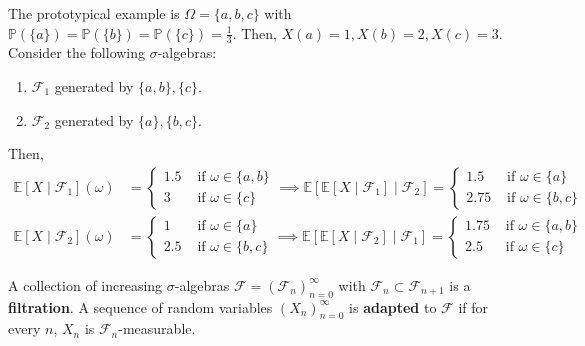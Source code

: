 	\begin{example}
		The prototypical example is $\Omega = \{a, b, c\}$ with $\mathbb{P}(\{a\}) = \mathbb{P}(\{b\}) = \mathbb{P}(\{c\}) = \frac{1}{3}$. Then, $X(a) = 1, X(b) = 2, X(c) = 3$. Consider the following $\sigma$-algebras: 
		\begin{enumerate}
			\item $\mathscr{F}_1$ generated by $\{a, b\}, \{c\}$. 
			\item $\mathscr{F}_2$ generated by $\{a\}, \{b, c\}$. 
		\end{enumerate}
		Then, 
		\begin{align}
			\mathbb{E}[X \mid \mathscr{F}_1](\omega) & = \begin{cases} 
				1.5 & \text{ if } \omega \in \{a, b\} \\ 
				3 & \text{ if } \omega \in \{c\} 
			\end{cases} \implies \mathbb{E}[ \mathbb{E}[X \mid \mathscr{F}_1] \mid \mathscr{F}_2] = 
			\begin{cases} 
				1.5 & \text{ if } \omega \in \{a\} \\ 
				2.75 & \text{ if } \omega \in \{b, c\} 
			\end{cases} \\ 
			\mathbb{E}[X \mid \mathscr{F}_2](\omega) & = \begin{cases} 
				1 & \text{ if } \omega \in \{a\} \\ 
				2.5 & \text{ if } \omega \in \{b, c\} 
			\end{cases} \implies \mathbb{E}[ \mathbb{E}[X \mid \mathscr{F}_2] \mid \mathscr{F}_1] = 
			\begin{cases} 
				1.75 & \text{ if } \omega \in \{a, b\} \\ 
				2.5 & \text{ if } \omega \in \{c\} 
			\end{cases}
		\end{align}
	\end{example}

	\begin{definition}[Filtration]
		A collection of increasing $\sigma$-algebras $\mathscr{F} = (\mathscr{F}_n)_{n=0}^\infty$ with $\mathscr{F}_n \subset \mathscr{F}_{n+1}$ is a \textbf{filtration}. A sequence of random variables $(X_n)_{n=0}^\infty$ is \textbf{adapted} to $\mathscr{F}$ if for every $n$, $X_n$ is $\mathscr{F}_n$-measurable. 
	\end{definition}

